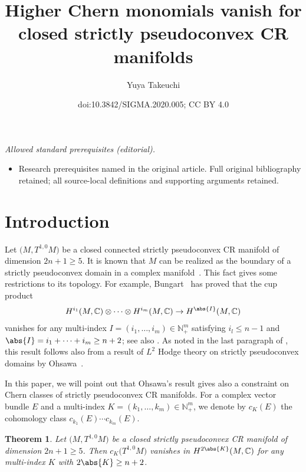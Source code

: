 \documentclass[10pt,a4paper]{amsart}
\title{Higher Chern monomials vanish for closed strictly pseudoconvex CR manifolds}
\author{Yuya Takeuchi}
\date{doi:10.3842/SIGMA.2020.005; CC BY 4.0}
\numberwithin{equation}{section}
\newtheorem{Theorem}{Theorem}[section]
\begin{document}
\maketitle
\noindent\textit{Allowed standard prerequisites (editorial).}\begin{itemize}
\item Research prerequisites named in the original article. Full original bibliography retained; all source-local definitions and supporting arguments retained.
\end{itemize}\medskip
\section{Introduction} \label{section:introduction}

Let $\big(M, T^{1, 0} M\big)$ be a closed connected strictly pseudoconvex CR manifold of dimension $2 n + 1\allowbreak \geq 5$. It is known that $M$ can be realized as the boundary of a strictly pseudoconvex domain in a complex manifold~\cite{Boutet-de-Monvel75,Harvey-Lawson75,Lempert95}. This fact gives some restrictions to its topology. For example, Bungart~\cite{Bungart92} has proved that the cup product
\begin{gather*}
H^{i_{1}}(M, \mathbb{C}) \otimes \dots \otimes H^{i_{m}}(M, \mathbb{C}) \to H^{\abs{I}}(M, \mathbb{C})
\end{gather*}
vanishes for any multi-index $I = (i_{1}, \dots , i_{m}) \in \mathbb{N}_{+}^{m}$ satisfying $i_{l} \leq n - 1$ and $\abs{I} = i_{1} + \dots + i_{m} \geq n + 2$; see also \cite{Popescu-Pampu08}. As noted in the last paragraph of \cite{Bungart92}, this result follows also from a result of $L^{2}$ Hodge theory on strictly pseudoconvex domains by Ohsawa~\cite{Ohsawa81,Ohsawa82}.

In this paper, we will point out that Ohsawa's result gives also a constraint on Chern classes of strictly pseudoconvex CR manifolds. For a complex vector bundle $E$ and a multi-index $K = (k_{1}, \dots , k_{m}) \in \mathbb{N}_{+}^{m}$, we denote by $c_{K}(E)$ the cohomology class $c_{k_{1}}(E) \dotsm c_{k_{m}}(E)$.


\begin{Theorem} \label{thm:vanishing-of-Chern-classes}Let $\big(M,T^{1,0} M\big)$ be a closed strictly pseudoconvex CR manifold of dimension $2 n + 1 \geq 5$. Then $c_{K}\big(T^{1,0}M\big)$ vanishes in $H^{2 \abs{K}}(M, \mathbb{C})$ for any multi-index $K$ with $2 \abs{K} \geq n + 2$.
\end{Theorem}
\end{document}

